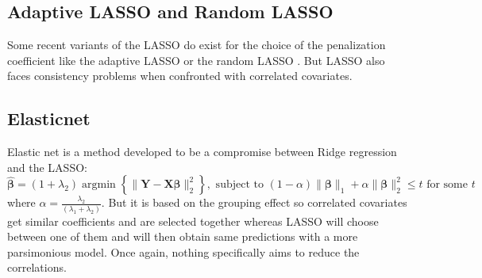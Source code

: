 \documentclass[11pt,a4paper]{report}
\begin{document}
		\subsection{Adaptive LASSO and Random LASSO}
			\cite{zou2006adaptive}%
			\cite{wang2011random}%
			 Some recent variants of the \textsc{LASSO} do exist for the choice of the penalization coefficient like the adaptive \textsc{LASSO} \cite{zou2006adaptive} or the random \textsc{LASSO} \cite{wang2011random}.  But \textsc{LASSO} also faces consistency problems \cite{Zhao2006MSC} when confronted with correlated covariates.
		\subsection{Elasticnet}
			\cite{zou2005regularization}
			Elastic net \cite{zou2005regularization} is a method developed to be a compromise between Ridge regression and the \textsc{LASSO}: 
	\begin{equation}
		\boldsymbol{\hat{\beta}}=(1+\lambda_2) \operatorname{argmin}\left\lbrace \parallel \boldsymbol{Y}-\boldsymbol{X\beta} \parallel_2^2 \right\rbrace, \textrm{ subject to } (1-\alpha)\parallel\boldsymbol{\beta}\parallel_1+\alpha\parallel\boldsymbol{\beta}\parallel_2^2\leq t \textrm{ for some } t
	\end{equation}
	where $\alpha=\frac{\lambda_2}{(\lambda_1+\lambda_2)}$. 
	But it is based on the grouping effect so correlated covariates get similar coefficients and are selected together whereas LASSO will choose between one of them and will then obtain same predictions with a more parsimonious model. Once again, nothing specifically aims to reduce the correlations. %
\end{document}
